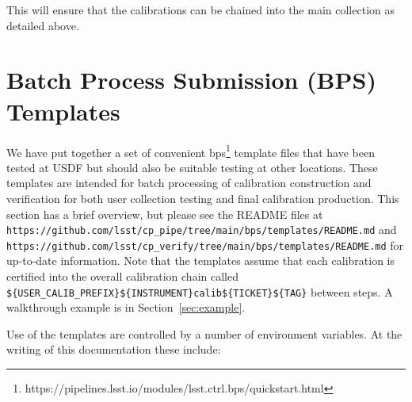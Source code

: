 \documentclass[DM,authoryear,toc]{lsstdoc}
\begin{document}
This will ensure that the calibrations can be chained into the main collection as detailed above.

\section{Batch Process Submission (BPS) Templates}

We have put together a set of convenient bps\footnote{https://pipelines.lsst.io/modules/lsst.ctrl.bps/quickstart.html} template files that have been tested at USDF but should also be suitable testing at other locations.
These templates are intended for batch processing of calibration construction and verification for both user collection testing and final calibration production.
This section has a brief overview, but please see the README files at \texttt{https://github.com/lsst/cp\_pipe/tree/main/bps/templates/README.md} and \texttt{https://github.com/lsst/cp\_verify/tree/main/bps/templates/README.md} for up-to-date information.
Note that the templates assume that each calibration is certified into the overall calibration chain called \texttt{\$\{USER\_CALIB\_PREFIX\}\$\{INSTRUMENT\}\/calib\/\$\{TICKET\}\/\$\{TAG\}} between steps.
A walkthrough example is in Section~\ref{sec:example}.

Use of the templates are controlled by a number of environment variables.
At the writing of this documentation these include:
\end{document}

